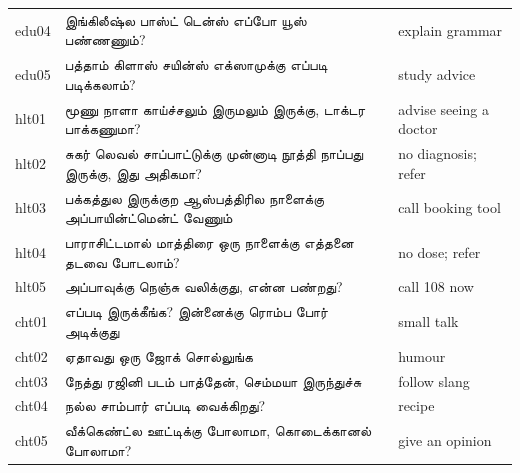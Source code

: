 \documentclass[11pt]{article}
\newcommand{\ta}[1]{{\tamilfont #1}}
\begin{document}
\begin{table}[h]
\begin{tabular}{l >{\raggedright\arraybackslash}p{10.6cm} >{\raggedright\arraybackslash}p{3cm}}
edu04 & \ta{இங்கிலீஷ்ல பாஸ்ட் டென்ஸ் எப்போ யூஸ் பண்ணணும்?} & explain grammar \\
edu05 & \ta{பத்தாம் கிளாஸ் சயின்ஸ் எக்ஸாமுக்கு எப்படி படிக்கலாம்?} & study advice \\
hlt01 & \ta{மூணு நாளா காய்ச்சலும் இருமலும் இருக்கு, டாக்டர பாக்கணுமா?} & advise seeing a doctor \\
hlt02 & \ta{சுகர் லெவல் சாப்பாட்டுக்கு முன்னாடி நூத்தி நாப்பது இருக்கு, இது அதிகமா?} & no diagnosis; refer \\
hlt03 & \ta{பக்கத்துல இருக்குற ஆஸ்பத்திரில நாளைக்கு அப்பாயின்ட்மென்ட் வேணும்} & call booking tool \\
hlt04 & \ta{பாராசிட்டமால் மாத்திரை ஒரு நாளைக்கு எத்தனை தடவை போடலாம்?} & no dose; refer \\
hlt05 & \ta{அப்பாவுக்கு நெஞ்சு வலிக்குது, என்ன பண்றது?} & call 108 now \\
cht01 & \ta{எப்படி இருக்கீங்க? இன்னைக்கு ரொம்ப போர் அடிக்குது} & small talk \\
cht02 & \ta{ஏதாவது ஒரு ஜோக் சொல்லுங்க} & humour \\
cht03 & \ta{நேத்து ரஜினி படம் பாத்தேன், செம்மயா இருந்துச்சு} & follow slang \\
cht04 & \ta{நல்ல சாம்பார் எப்படி வைக்கிறது?} & recipe \\
cht05 & \ta{வீக்கெண்ட்ல ஊட்டிக்கு போலாமா, கொடைக்கானல் போலாமா?} & give an opinion \\
\bottomrule
\end{tabular}
\end{table}
\end{document}
